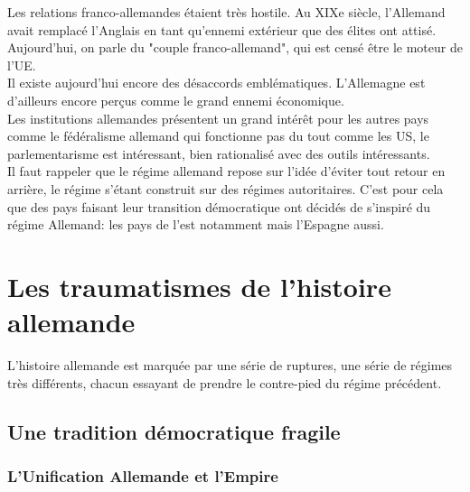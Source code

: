 \documentclass[10pt, a4paper, openany]{book}
\begin{document}
Les relations franco-allemandes étaient très hostile. Au XIXe siècle, l'Allemand avait remplacé l'Anglais en tant qu'ennemi extérieur que des élites ont attisé. \\
Aujourd'hui, on parle du "couple franco-allemand", qui est censé être le moteur de l'UE. \\
Il existe aujourd'hui encore des désaccords emblématiques. L'Allemagne est d'ailleurs encore perçus comme le grand ennemi économique. \\
Les institutions allemandes présentent un grand intérêt pour les autres pays comme le fédéralisme allemand qui fonctionne pas du tout comme les US, le parlementarisme est intéressant, bien rationalisé avec des outils intéressants. \\
Il faut rappeler que le régime allemand repose sur l'idée d'éviter tout retour en arrière, le régime s'étant construit sur des régimes autoritaires. C'est pour cela que des pays faisant leur transition démocratique ont décidés de s'inspiré du régime Allemand: les pays de l'est notamment mais l'Espagne aussi. 

\section{Les traumatismes de l'histoire allemande}

L'histoire allemande est marquée par une série de ruptures, une série de régimes très différents, chacun essayant de prendre le contre-pied du régime précédent. 

\subsection{Une tradition démocratique fragile}

\subsubsection{L'Unification Allemande et l'Empire}
\end{document}
